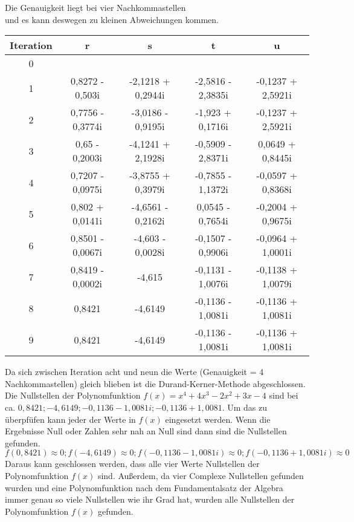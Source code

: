 \documentclass[12pt]{article}
\begin{document}
        
        \begin{center}
        Die Genauigkeit liegt bei vier Nachkommastellen \\ und es kann deswegen zu kleinen Abweichungen kommen.
        \begin{tabular}{c|c c c c}
            Iteration & r & s & t & u \\
            \hline
            0 \\
            1 & 0,8272 - 0,503i & -2,1218 + 0,2944i & -2,5816 - 2,3835i & -0,1237 + 2,5921i \\
            2 & 0,7756 - 0,3774i & -3,0186 - 0,9195i & -1,923 + 0,1716i & -0,1237 + 2,5921i \\
            3 & 0,65 - 0,2003i & -4,1241 + 2,1928i & -0,5909 - 2,8371i & 0,0649 + 0,8445i \\
            4 & 0,7207 - 0,0975i & -3,8755 + 0,3979i & -0,7855 - 1,1372i & -0,0597 + 0,8368i \\
            5 & 0,802 + 0,0141i & -4,6561 - 0,2162i & 0,0545 - 0,7654i & -0,2004 + 0,9675i \\
            6 & 0,8501 - 0,0067i & -4,603 - 0,0028i & -0,1507 - 0,9906i & -0,0964 + 1,0001i \\
            7 & 0,8419 - 0,0002i & -4,615 & -0,1131 - 1,0076i & -0,1138 + 1,0079i \\
            8 & 0,8421 & -4,6149 & -0,1136 - 1,0081i & -0,1136 + 1,0081i \\
            9 & 0,8421 & -4,6149 & -0,1136 - 1,0081i & -0,1136 + 1,0081i \\
        \end{tabular}
        \end{center}
        Da sich zwischen Iteration acht und neun die Werte (Genauigkeit = 4 Nachkommastellen) gleich blieben ist die Durand-Kerner-Methode abgeschlossen. Die Nullstellen der Polynomfunktion $f(x) = x^4 + 4x^3 - 2x^2 + 3x - 4$ sind bei ca. $0,8421; -4,6149; -0,1136 - 1,0081i; -0,1136 + 1,0081$. Um das zu überpfüfen kann jeder der Werte in $f(x)$ eingesetzt werden. Wenn die Ergebnisse Null oder Zahlen sehr nah an Null sind dann sind die Nullstellen gefunden.
        \begin{displaymath}
            f(0,8421) \approx 0; f(-4,6149) \approx 0; f(-0,1136 - 1,0081i) \approx 0; f(-0,1136 + 1,0081i) \approx 0
        \end{displaymath}
        Daraus kann geschlossen werden, dass alle vier Werte Nullstellen der Polynomfunktion $f(x)$ sind. Außerdem, da vier Complexe Nullstellen gefunden wurden und eine Polynomfunktion nach dem Fundamentalsatz der Algebra immer genau so viele Nullstellen wie ihr Grad hat, wurden alle Nullstellen der Polynomfunktion $f(x)$ gefunden.
        
\end{document}
